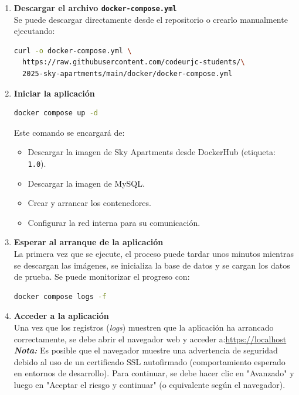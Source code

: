 \begin{enumerate}
    \item \textbf{Descargar el archivo \texttt{docker-compose.yml}} \\
    Se puede descargar directamente desde el repositorio o crearlo manualmente ejecutando:
\begin{lstlisting}[language=bash, basicstyle=\ttfamily\small]
curl -o docker-compose.yml \
  https://raw.githubusercontent.com/codeurjc-students/\
  2025-sky-apartments/main/docker/docker-compose.yml
\end{lstlisting}

    \item \textbf{Iniciar la aplicación}
\begin{lstlisting}[language=bash, basicstyle=\ttfamily\small]
docker compose up -d
\end{lstlisting}
    Este comando se encargará de:
    \begin{itemize}
        \item Descargar la imagen de Sky Apartments desde DockerHub (etiqueta: \texttt{1.0}).
        \item Descargar la imagen de MySQL.
        \item Crear y arrancar los contenedores.
        \item Configurar la red interna para su comunicación.
    \end{itemize}

    \item \textbf{Esperar al arranque de la aplicación} \\
    La primera vez que se ejecute, el proceso puede tardar unos minutos mientras se descargan las imágenes, se inicializa la base de datos y se cargan los datos de prueba. Se puede monitorizar el progreso con:
\begin{lstlisting}[language=bash, basicstyle=\ttfamily\small]
docker compose logs -f
\end{lstlisting}

    \item \textbf{Acceder a la aplicación} \\
    Una vez que los registros (\textit{logs}) muestren que la aplicación ha arrancado correctamente, se debe abrir el navegador web y acceder a:\newline \url{https://localhost} \\
    
    \textit{\textbf{Nota:}} Es posible que el navegador muestre una advertencia de seguridad debido al uso de un certificado SSL autofirmado (comportamiento esperado en entornos de desarrollo). Para continuar, se debe hacer clic en "Avanzado" y luego en "Aceptar el riesgo y continuar" (o equivalente según el navegador).
\end{enumerate}

